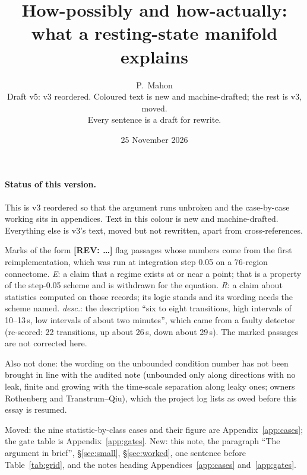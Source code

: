 \documentclass[11pt]{article}
\title{How-possibly and how-actually:\\ what a resting-state manifold explains}
\author{P.~Mahon \\ \small Draft v5: v3 reordered. Coloured text is new and machine-drafted; the rest is v3, moved. \\ \small Every sentence is a draft for rewrite.}
\date{25 November 2026}
\newcommand{\REV}[1]{\textcolor{purple!70!black}{\textbf{[REV: #1]}}}
\newenvironment{newtext}{\par\color{teal!55!black}}{\par}
\begin{document}
\maketitle

\begin{newtext}
\paragraph{Status of this version.} This is v3 reordered so that the argument runs unbroken and the case-by-case working sits in appendices. Text in this colour is new and machine-drafted. Everything else is v3's text, moved but not rewritten, apart from cross-references.

Marks of the form \REV{\ldots} flag passages whose numbers come from the first reimplementation, which was run at integration step 0.05 on a 76-region connectome. \emph{E}: a claim that a regime exists at or near a point; that is a property of the step-0.05 scheme and is withdrawn for the equation. \emph{R}: a claim about statistics computed on those records; its logic stands and its wording needs the scheme named. \emph{desc.}: the description ``six to eight transitions, high intervals of 10--13\,s, low intervals of about two minutes'', which came from a faulty detector (re-scored: 22 transitions, up about 26\,s, down about 29\,s). The marked passages are not corrected here.

Also not done: the wording on the unbounded condition number has not been brought in line with the audited note (unbounded only along directions with no leak, finite and growing with the time-scale separation along leaky ones; owners Rothenberg and Transtrum--Qiu), which the project log lists as owed before this essay is resumed.

Moved: the nine statistic-by-class cases and their figure are Appendix~\ref{app:cases}; the gate table is Appendix~\ref{app:gates}. New: this note, the paragraph ``The argument in brief'', \S\ref{sec:small}, \S\ref{sec:worked}, one sentence before Table~\ref{tab:grid}, and the notes heading Appendices~\ref{app:cases} and~\ref{app:gates}.
\end{newtext}
\end{document}
